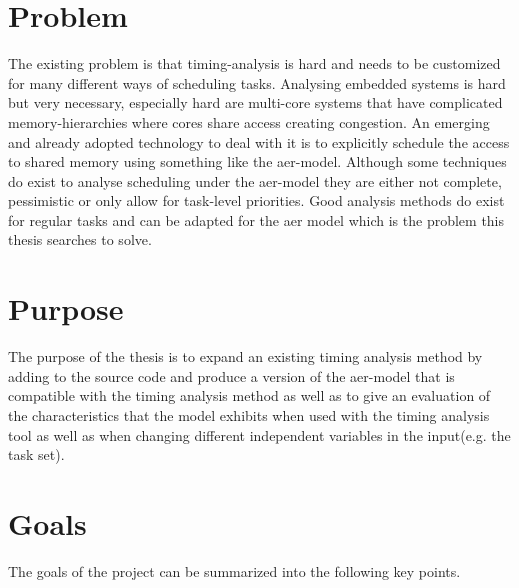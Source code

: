 \documentclass{kththesis}
\begin{document}
\section{Problem}

The existing problem is that timing-analysis is hard and needs to be customized for many
different ways of scheduling tasks. Analysing embedded systems is hard but very necessary,
especially hard are multi-core systems \parencite{davis_survey_2011} that have complicated
memory-hierarchies where cores share access creating congestion. An emerging and already adopted
technology to deal with it is to explicitly schedule the access to shared memory using something
like the \acrshort{aer}-model.  Although some techniques do exist to analyse scheduling under the
\acrshort{aer}-model they are either not complete, pessimistic or only allow for task-level
priorities. Good analysis methods do exist for regular tasks and can be adapted for the
\acrshort{aer} model which is the problem this thesis searches to solve.



\section{Purpose}

The purpose of the thesis is to expand an existing timing analysis method by adding to the source
code and produce a version of the \acrshort{aer}-model that is compatible with the timing analysis
method as well as to give an evaluation of the characteristics that the model exhibits when used
with the timing analysis tool as well as when changing different independent variables in the
input(e.g. the task set).


\section{Goals}

The goals of the project can be summarized into the following key points.
\end{document}
